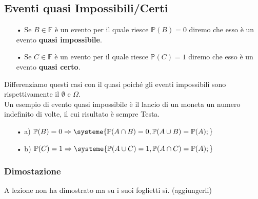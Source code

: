 \subsection{Eventi quasi Impossibili/Certi}
\begin{itemize}
\item[•] Se $B \in \mathbb{F}$ è un evento per il quale riesce $\mathbb{P}(B) = 0$ diremo che esso è un evento \textbf{quasi impossibile}.
\item[•] Se $C \in \mathbb{F}$ è un evento per il quale riesce $\mathbb{P}(C) = 1$ diremo che esso è un evento \textbf{quasi certo}.
\end{itemize}
Differenziamo questi casi con il quasi poiché gli eventi impossibili sono rispettivamente il $\emptyset$ e $\Omega$.\\
Un esempio di evento quasi impossibile è il lancio di un moneta un numero indefinito di volte, il cui risultato è sempre Testa.

\begin{itemize}
\item[•] a) $\mathbb{P}(B) = 0 \Rightarrow \systeme{\mathbb{P}(A \cap B) = 0, \mathbb{P}(A \cup B) = \mathbb{P}(A);} $
\item[•] b) $ \mathbb{P}(C) = 1 \Rightarrow \systeme{\mathbb{P}(A \cup C) = 1,  \mathbb{P}(A \cap C) = \mathbb{P}(A);} $
\end{itemize}

\subsubsection{Dimostazione}
A lezione non ha dimostrato ma su i suoi foglietti sì. (aggiungerli)













